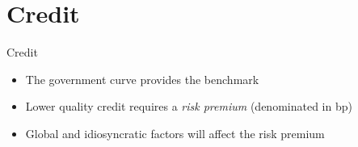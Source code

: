 \documentclass[14pt,xcolor=pdftex,dvipsnames,table]{beamer}\usepackage[]{graphicx}\usepackage[]{color}
\begin{document}
\section{Credit}
\begin{frame}{Credit}
\begin{itemize}
\item The government curve provides the benchmark
\item Lower quality credit requires a \emph{risk premium} (denominated in bp)
\item Global and idiosyncratic factors will affect the risk premium
\end{itemize}
\end{frame}
\end{document}
